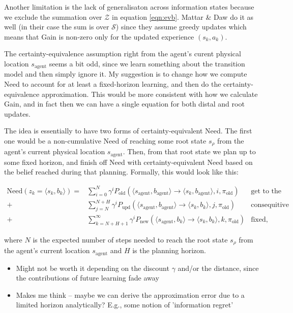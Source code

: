 \documentclass{article}
\newcommand{\old}{\text{old}}
\begin{document}
\bigbreak

Another limitation is the lack of generalisaton across information states because we exclude the summation over $\mathcal{Z}$ in equation \ref{eqn:evb}. 
Mattar \& Daw do it as well (in their case the sum is over $\mathcal{S}$) since they assume greedy updates which means that Gain is non-zero only for 
the updated experience $(s_k, a_k)$.

\bigbreak

The certainty-equivalence assumption right from the agent's curent physical location $s_\text{agent}$ seems a bit odd, since we learn something about 
the transition model and then simply ignore it. My suggestion is to change how we compute Need to account for at least a fixed-horizon learning, and 
then do the certainty-equivalence approximation. This would be more consistent with how we calculate Gain, and in fact then we can have a single equation 
for both distal and root updates.

\bigbreak

The idea is essentially to have two forms of certainty-equivalent Need. The first one would be a non-cumulative Need of reaching some root state $s_\rho$ 
from the agent's current physical location $s_\text{agent}$. Then, from that root state we plan up to some fixed horizon, and finish off Need with certainty-equivalent 
Need based on the belief reached during that planning. Formally, this would look like this:
\begin{linenomath}
\begin{align}
    \text{Need}(z_k=\langle s_k, b_k \rangle) = &\sum_{i=0}^{N} \gamma^i P_\text{old}(\langle s_\text{agent}, b_\text{agent} \rangle \rightarrow \langle s_k, b_\text{agent} \rangle, i, \pi_\old) & \text{get to the root, fixed belief} \nonumber \\
    + &\sum_{j=N}^{N+H} \gamma^i P_\text{upd}(\langle s_\text{agent}, b_\text{agent} \rangle \rightarrow \langle s_k, b_k \rangle, j, \pi_\old) & \text{consequitive belief updates} \nonumber \\
    + &\sum_{k=N+H+1}^{\infty} \gamma^i P_\text{new}(\langle s_\text{agent}, b_k \rangle \rightarrow \langle s_k, b_k \rangle, k, \pi_\old) & \text{fixed, updated belief} \nonumber
\end{align}
\end{linenomath}
where $N$ is the expected number of steps needed to reach the root state $s_\rho$ from the agent's current location $s_\text{agent}$ and 
$H$ is the planning horizon.

\bigbreak

\begin{itemize}
    \item Might not be worth it depending on the discount $\gamma$ and/or the distance, since the contributions of future learning fade away 
    \item Makes me think -- maybe we can derive the approximation error due to a limited horizon analytically? E.g., some notion of 'information regret'
\end{itemize}
\end{document}

